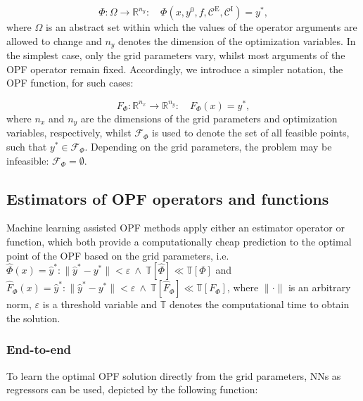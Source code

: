 \documentclass[journal]{IEEEtran}
\begin{document}
\begin{equation}
    \Phi: \Omega \to \mathbb{R}^{n_{y}}: \quad \Phi\left( x, y^{0}, f, \mathcal{C}^{\mathrm{E}}, \mathcal{C}^{\mathrm{I}} \right) = y^{*},
    \label{opf-operator}
\end{equation}
where $\Omega$ is an abstract set within which the values of the operator arguments are allowed to change and $n_{y}$ denotes the dimension of the optimization variables. In the simplest case, only the grid parameters vary, whilst most arguments of the OPF operator remain fixed. Accordingly, we introduce a simpler notation, the OPF function, for such cases:

\begin{equation}
    F_{\Phi}: \mathbb{R}^{n_{x}} \to \mathbb{R}^{n_{y}}: \quad F_{\Phi}(x) = y^{*},
    \label{opf-function}
\end{equation}
where $n_{x}$ and $n_{y}$ are the dimensions of the grid parameters and optimization variables, respectively, whilst $\mathcal{F}_{\Phi}$ is used to denote the set of all feasible points, such that $y^{*} \in \mathcal{F}_{\Phi}$. Depending on the grid parameters, the problem may be infeasible: $\mathcal{F}_{\Phi} = \emptyset$.

\subsection{Estimators of OPF operators and functions}
Machine learning assisted OPF methods apply either an estimator operator or function, which both provide a computationally cheap prediction to the optimal point of the OPF based on the grid parameters, i.e. $\hat{\Phi}(x) = \hat{y}^{*}: \| \hat{y}^{*} - y^{*} \| < \varepsilon \ \land \  \mathbb{T}[\hat{\Phi}] \ll \mathbb{T}[\Phi]$ and $\hat{F}_{\Phi}(x) = \hat{y}^{*}: \| \hat{y}^{*} - y^{*} \| < \varepsilon \ \land \ \mathbb{T}[\hat{F}_{\Phi}] \ll \mathbb{T}[F_{\Phi}]$, where $\| \cdot \|$ is an arbitrary norm, $\varepsilon$ is a threshold variable and $\mathbb{T}$ denotes the computational time to obtain the solution.

\subsubsection{End-to-end}
To learn the optimal OPF solution directly from the grid parameters, NNs as regressors can be used, depicted by the following function:
\end{document}
